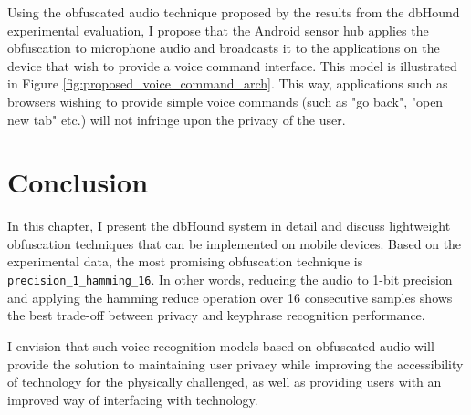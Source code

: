Using the obfuscated audio technique proposed by the results from the dbHound experimental evaluation, I propose that the Android sensor hub applies the obfuscation to microphone audio and broadcasts it to the applications on the device that wish to provide a voice command interface.
 This model is illustrated in Figure \ref{fig:proposed_voice_command_arch}.
 This way, applications such as browsers wishing to provide simple voice commands (such as "go back", "open new tab" etc.) will not infringe upon the privacy of the user.




\section{Conclusion}


In this chapter, I present the dbHound system in detail and discuss lightweight obfuscation techniques that can be implemented on mobile devices.
 Based on the experimental data, the most promising obfuscation technique is \texttt{precision\_1\_hamming\_16}.
 In other words, reducing the audio to 1-bit precision and applying the hamming reduce operation over 16 consecutive samples shows the best trade-off between privacy and keyphrase recognition performance.


I envision that such voice-recognition models based on obfuscated audio will provide the solution to maintaining user privacy while improving the accessibility of technology for the physically challenged, as well as providing users with an improved way of interfacing with technology.
